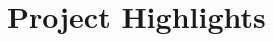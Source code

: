 \documentclass[]{Nikhil_Kadiyan_Resume}
\begin{document}

\section{Project Highlights}
\hrulefill



\end{document}
